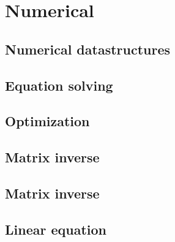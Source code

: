 
\chapter{Numerical}

\section{Numerical datastructures}

\section{Equation solving}

\section{Optimization}

\section{Matrix inverse}

\section{Matrix inverse}

\section{Linear equation}

